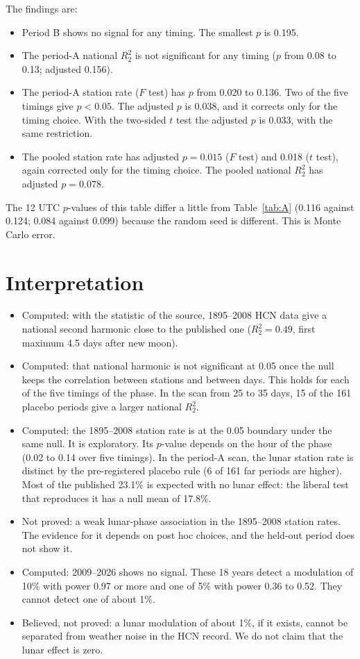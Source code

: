 \documentclass[11pt]{article}
\newcommand{\Rtwo}{R^2_2}
\begin{document}
The findings are:
\begin{itemize}
\item Period B shows no signal for any timing. The smallest $p$ is 0.195.
\item The period-A national $\Rtwo$ is not significant for any timing ($p$ from 0.08 to 0.13; adjusted 0.156).
\item The period-A station rate ($F$ test) has $p$ from 0.020 to 0.136. Two of the five timings give $p<0.05$. The adjusted $p$ is 0.038, and it corrects only for the timing choice. With the two-sided $t$ test the adjusted $p$ is 0.033, with the same restriction.
\item The pooled station rate has adjusted $p=0.015$ ($F$ test) and 0.018 ($t$ test), again corrected only for the timing choice. The pooled national $\Rtwo$ has adjusted $p=0.078$.
\end{itemize}
The 12 UTC $p$-values of this table differ a little from Table~\ref{tab:A} (0.116 against 0.124; 0.084 against 0.099) because the random seed is different. This is Monte Carlo error.

\section{Interpretation}
\begin{itemize}
\item Computed: with the statistic of the source, 1895--2008 HCN data give a national second harmonic close to the published one ($\Rtwo=0.49$, first maximum 4.5 days after new moon).
\item Computed: that national harmonic is not significant at 0.05 once the null keeps the correlation between stations and between days. This holds for each of the five timings of the phase. In the scan from 25 to 35 days, 15 of the 161 placebo periods give a larger national $\Rtwo$.
\item Computed: the 1895--2008 station rate is at the 0.05 boundary under the same null. It is exploratory. Its $p$-value depends on the hour of the phase (0.02 to 0.14 over five timings). In the period-A scan, the lunar station rate is distinct by the pre-registered placebo rule (6 of 161 far periods are higher). Most of the published 23.1\% is expected with no lunar effect: the liberal test that reproduces it has a null mean of 17.8\%.
\item Not proved: a weak lunar-phase association in the 1895--2008 station rates. The evidence for it depends on post hoc choices, and the held-out period does not show it.
\item Computed: 2009--2026 shows no signal. These 18 years detect a modulation of 10\% with power 0.97 or more and one of 5\% with power 0.36 to 0.52. They cannot detect one of about 1\%.
\item Believed, not proved: a lunar modulation of about 1\%, if it exists, cannot be separated from weather noise in the HCN record. We do not claim that the lunar effect is zero.
\end{itemize}
\end{document}
